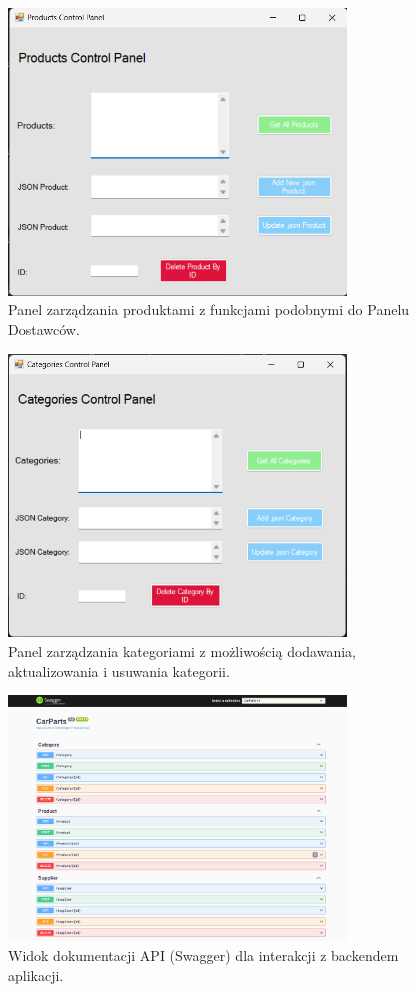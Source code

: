 \begin{figure}[h!]
    \centering
    \includegraphics[width=0.8\textwidth]{img_tests/suppliers_test_10.png}
    \caption{Panel zarządzania produktami z funkcjami podobnymi do Panelu Dostawców.}
    \label{fig:suppliers_test_10}
\end{figure}

\begin{figure}[h!]
    \centering
    \includegraphics[width=0.8\textwidth]{img_tests/suppliers_test_11.png}
    \caption{Panel zarządzania kategoriami z możliwością dodawania, aktualizowania i usuwania kategorii.}
    \label{fig:suppliers_test_11}
\end{figure}

\begin{figure}[h!]
    \centering
    \includegraphics[width=0.8\textwidth]{img_tests/swagger.png}
    \caption{Widok dokumentacji API (Swagger) dla interakcji z backendem aplikacji.}
    \label{fig:swagger}
\end{figure}
